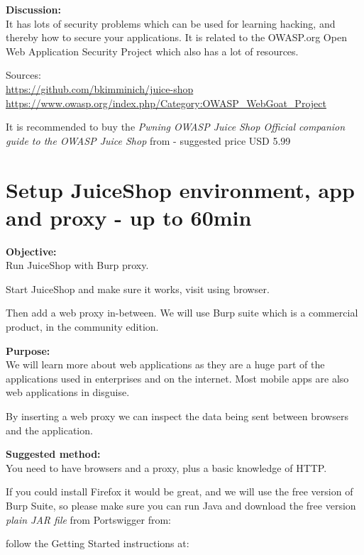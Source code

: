 \documentclass[a4paper,11pt,notitlepage]{report}
\begin{document}
{\bf Discussion:}\\
It has lots of security problems which can be used for learning
hacking, and thereby how to secure your applications. It is  related
to the OWASP.org Open Web Application Security Project which also has a
lot of resources.

Sources:\\
\url{https://github.com/bkimminich/juice-shop}\\
\url{https://www.owasp.org/index.php/Category:OWASP_WebGoat_Project}

It is recommended to buy the \emph{Pwning OWASP Juice Shop Official companion guide to the OWASP Juice Shop} from  - suggested price USD 5.99



\chapter{Setup JuiceShop environment, app and proxy - up to 60min}
\label{ex:js-burp}

{\bf Objective:}\\
Run JuiceShop with Burp proxy.

Start JuiceShop and make sure it works, visit using browser.

Then add a web proxy in-between. We will use Burp suite which is a commercial product, in the community edition.

{\bf Purpose:}\\
We will learn more about web applications as they are a huge part of the applications used in enterprises and on the internet. Most mobile apps are also web applications in disguise.

By inserting a web proxy we can inspect the data being sent between browsers and the application.

{\bf Suggested method:}\\
You need to have browsers and a proxy, plus a basic knowledge of HTTP.

If you could install Firefox it would be great, and we will use the
free version of Burp Suite, so please make sure you can run Java and
download the free version \emph{plain JAR file} from Portswigger from:


follow the Getting Started instructions at:\\
\end{document}
